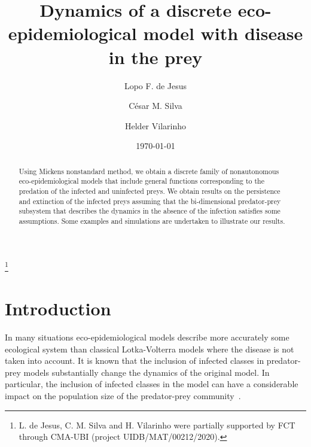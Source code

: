 \documentclass[reqno]{amsart}
\begin{document}
\title[]
   {Dynamics of a discrete eco-epidemiological model with disease in the prey}
\author{Lopo F. de Jesus}
\address{L. F. de Jesus
   Departamento de Matem\'atica\\
   Universidade da Beira Interior\\
   6201-001 Covilh\~a\\
   Portugal}
\author{C\'esar M. Silva}
\address{C. M. Silva\\
   Departamento de Matem\'atica\\
   Universidade da Beira Interior\\
   6201-001 Covilh\~a\\
   Portugal}
\author{Helder Vilarinho}
\address{H. Vilarinho\\
   Departamento de Matem\'atica\\
   Universidade da Beira Interior\\
   6201-001 Covilh\~a\\
   Portugal}
\date{\today}
\thanks{L. de Jesus, C. M. Silva and H. Vilarinho were partially supported by FCT through CMA-UBI (project UIDB/MAT/00212/2020).}
\begin{abstract}
 Using Mickens nonstandard method, we obtain a discrete family of nonautonomous eco-epidemiological models that include general functions corresponding to the predation of the infected and uninfected preys. We obtain results on the persistence and extinction of the infected preys assuming that the bi-dimensional predator-prey subsystem that describes the dynamics in the absence of the infection satisfies some assumptions. Some examples and simulations are undertaken to {illustrate} our results.
\end{abstract}
\maketitle
\section{Introduction}
{In many situations eco-epidemiological models describe more accurately some ecological system than classical Lotka-Volterra models where the disease is not taken into account. It is known that the inclusion of infected classes in predator-prey models substantially change the dynamics of the original model. In particular, the inclusion of infected classes in the model can have a considerable impact on the population size of the predator-prey community~\cite{Hethcote-Wang-Han-Ma-TPB-2004, Koopmans-Wilbrink-Conyn-Natrop-Nat-Vennema-Lancet-2004}.}
\end{document}
